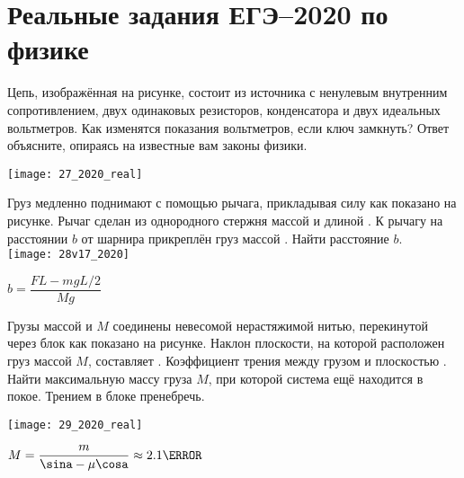 \documentclass[a4paper,12pt]{extarticle}
\begin{document}
\section*{Реальные задания ЕГЭ–2020 по физике}


\setcounter{question}{26}
\begin{question}[ID=27]
    Цепь, изображённая на рисунке, состоит из источника с ненулевым
    внутренним сопротивлением, двух одинаковых резисторов,
    конденсатора и двух идеальных вольтметров. Как изменятся
    показания вольтметров, если ключ замкнуть? Ответ объясните,
    опираясь на известные вам законы физики.

    \hfil\texttt{[image: 27\_2020\_real]}\\
  \begin{solution} \end{solution}
\end{question}


\begin{question}[ID=28]
  Груз медленно поднимают с помощью рычага, прикладывая силу \FN[350] как
  показано на рисунке. Рычаг сделан из однородного
  стержня массой \mkg[10] и длиной \Lm[4]. К рычагу на расстоянии $b$ от
  шарнира прикреплён груз массой \Mkg[75]. Найти расстояние $b$. \\[1ex]

    \hfil\texttt{[image: 28v17\_2020]}\\
  \begin{solution} $b = \dfrac{FL - mgL/2}{Mg}$ \end{solution}
\end{question}

\begin{question}[ID=29]
  Грузы массой \mkg[0.5] и $M$ соединены невесомой нерастяжимой нитью,
  перекинутой через блок как показано на рисунке. Наклон плоскости, на
  которой расположен груз массой $M$, составляет \agr[30]. Коэффициент
  трения между грузом и плоскостью \mub[0.3]. Найти максимальную массу
  груза $M$, при которой система ещё находится в покое.
  Трением в блоке пренебречь.

    \hfil\texttt{[image: 29\_2020\_real]}\\
  \begin{solution} $M=\dfrac{m}{\sina-\mu\cosa} \approx \num{2.1}\kg$ \end{solution}
\end{question}
\end{document}
